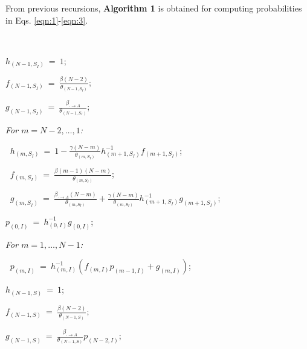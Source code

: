 \documentclass[10pt,A4paper]{article}
\begin{document}
\par\noindent From previous recursions, {\bf Algorithm 1} is obtained for computing probabilities in Eqs. \eqref{eqn:1}-\eqref{eqn:3}.\\

\par{}\\
\begin{minipage}{9cm}
\begin{description}
  \item $h_{(N-1,S_I)} ~=~ 1$;
  \item $f_{(N-1,S_I)} ~=~ \frac{\beta(N-2)}{\theta_{(N-1,S_I)}}$;
  \item $g_{(N-1,S_I)} ~=~ \frac{\beta_{\cdot\rightarrow A}}{\theta_{(N-1,S_I)}}$;
  \item \it For $m=N-2,\dots,1$:
  \item $~$\hspace{0.5cm} $h_{(m,S_I)} ~=~ 1-\frac{\gamma(N-m)}{\theta_{(m,S_I)}}h_{(m+1,S_I)}^{-1}f_{(m+1,S_I)}$;
  \item $~$\hspace{0.5cm} $f_{(m,S_I)} ~=~ \frac{\beta(m-1)(N-m)}{\theta_{(m,S_I)}}$;
  \item $~$\hspace{0.5cm} $g_{(m,S_I)} ~=~ \frac{\beta_{\cdot\rightarrow A}(N-m)}{\theta_{{(m,S_I)}}}+\frac{\gamma(N-m)}{\theta_{{(m,S_I)}}}h_{(m+1,S_I)}^{-1}g_{(m+1,S_I)}$;
\end{description}
\end{minipage}\begin{minipage}{9cm}
\begin{description}
  \item $p_{(0,I)} ~=~ h_{(0,I)}^{-1}g_{(0,I)}$;
  \item \it For $m=1,\dots,N-1$:
  \item $~$\hspace{0.5cm} $p_{(m,I)} ~=~ h_{(m,I)}^{-1}\left(f_{(m,I)}p_{(m-1,I)}+g_{(m,I)}\right)$;
  \item $h_{(N-1,S)} ~=~ 1$;
  \item $f_{(N-1,S)} ~=~ \frac{\beta(N-2)}{\theta_{(N-1,S)}}$;
  \item $g_{(N-1,S)} ~=~ \frac{\beta_{\cdot\rightarrow A}}{\theta_{(N-1,S)}}p_{(N-2,I)}$;
  \item $~$
\end{description}
\end{minipage}
\end{document}
